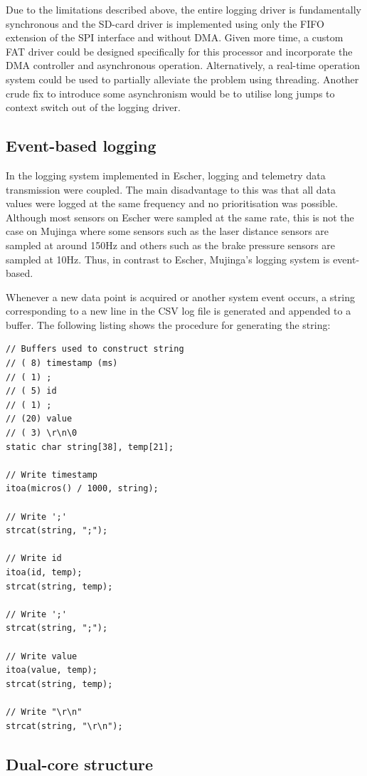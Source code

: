 Due to the limitations described above, the entire logging driver is fundamentally synchronous and the SD-card driver is implemented using only the FIFO extension of the SPI interface and without DMA. Given more time, a custom FAT driver could be designed specifically for this processor and incorporate the DMA controller and asynchronous operation. Alternatively, a real-time operation system could be used to partially alleviate the problem using threading. Another crude fix to introduce some asynchronism would be to utilise long jumps to context switch out of the logging driver.

\subsection{Event-based logging}

In the logging system implemented in Escher, logging and telemetry data transmission were coupled. The main disadvantage to this was that all data values were logged at the same frequency and no prioritisation was possible. Although most sensors on Escher were sampled at the same rate, this is not the case on Mujinga where some sensors such as the laser distance sensors are sampled at around 150Hz and others such as the brake pressure sensors are sampled at 10Hz. Thus, in contrast to Escher, Mujinga's logging system is event-based.

Whenever a new data point is acquired or another system event occurs, a string corresponding to a new line in the CSV log file is generated and appended to a buffer. The following listing shows the procedure for generating the string:

\begin{verbatim}
// Buffers used to construct string
// ( 8) timestamp (ms)
// ( 1) ;
// ( 5) id
// ( 1) ;
// (20) value
// ( 3) \r\n\0
static char string[38], temp[21];

// Write timestamp
itoa(micros() / 1000, string);

// Write ';'
strcat(string, ";");

// Write id
itoa(id, temp);
strcat(string, temp);

// Write ';'
strcat(string, ";");

// Write value
itoa(value, temp);
strcat(string, temp);

// Write "\r\n"
strcat(string, "\r\n");
\end{verbatim}

\subsection{Dual-core structure}

